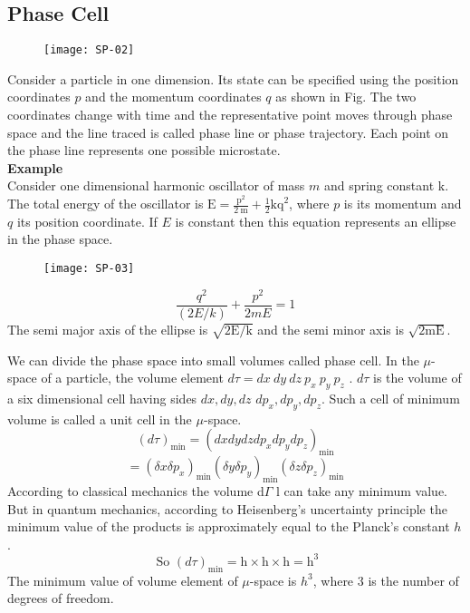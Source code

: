 \subsection{Phase Cell}
\begin{figure}[H]
	\centering
	\texttt{[image: SP-02]}
\end{figure}
\par Consider a particle in one dimension. Its state can be specified using the position coordinates $p$ and the momentum coordinates $q$ as shown in Fig. The two coordinates change with time and the representative point moves through phase space and the line traced is called phase line or phase trajectory. Each point on the phase line represents one possible microstate.\\
\textbf{Example}\\
Consider one dimensional harmonic oscillator of mass $m$ and spring constant $\mathrm{k}$. The total energy of the oscillator is $\mathrm{E}=\frac{\mathrm{p}^{2}}{2 \mathrm{~m}}+\frac{1}{2} \mathrm{kq}^{2}$, where $p$ is its momentum and $q$ its position coordinate. If $E$ is constant then this equation represents an ellipse in the phase space.
\begin{figure}[H]
	\centering
	\texttt{[image: SP-03]}
\end{figure}
$$\frac{q^{2}}{(2 E / k)}+\frac{p^{2}}{2 m E}=1$$
The semi major axis of the ellipse is $\sqrt{2 \mathrm{E} / \mathrm{k}}$ and the semi minor axis is $\sqrt{2 \mathrm{mE}}$.\\
\par We can divide the phase space into small volumes called phase cell. In the $\mu$-space of a particle, the volume element $d \tau=d x\  d y \ d z\  p_{x}\  p_y \ p_z$ . $d\tau$  is the volume of a six dimensional cell having sides ${d x, d y, d z}$ $d p_{x}, d p_{y}, d p_{z}$. Such a cell of minimum volume is called a unit cell in the $\mu$-space.
$$(d \tau)_{\min }=\left(d x d y d z d p_{x} d p_{y} d p_{z}\right)_{\min }$$
$$=\left(\delta x \delta p_{x}\right)_{\min }\left(\delta y \delta p_{y}\right)_{\min }\left(\delta z \delta p_{z}\right)_{\min }$$
According to classical mechanics the volume d$\Gamma$
 l can take any minimum value. But in quantum mechanics, according to Heisenberg's uncertainty principle the minimum value of the products is approximately equal to the Planck's constant $h$.\\
$$\text{ So }(d \tau)_{\min }=\mathrm{h} \times \mathrm{h} \times \mathrm{h}=\mathrm{h}^{3}$$
 The minimum value of volume element of $\mu$-space is $h^{3}$, where 3 is the number of degrees of freedom.\\
